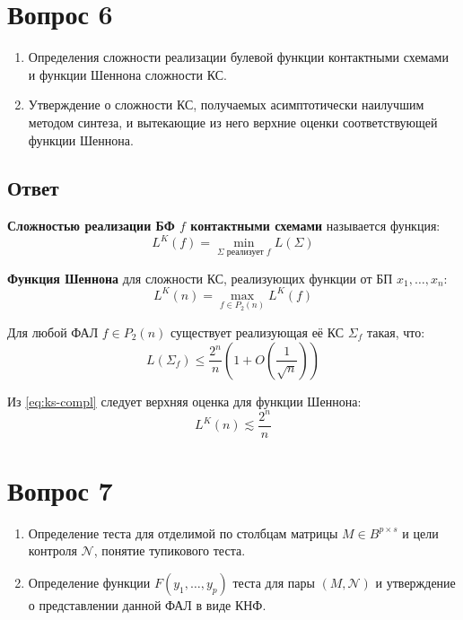 \documentclass[11pt]{article}
\def\zall{\setcounter{Def}{0}\setcounter{lem}{0}\setcounter{cnsqnc}{0}\setcounter{th}{0}\setcounter{Cmt}{0}\setcounter{equation}{0}\setcounter{stnmt}{0}}
\newcounter{Def}\setcounter{Def}{0}
\def\df{\par\smallskip\refstepcounter{Def}\textbf{\arabic{Def}}}
\newtheorem*{Def}{Определение \df}
\newcounter{lem}\setcounter{lem}{0}
\newcounter{th}\setcounter{th}{0}
\def\th{\par\smallskip\refstepcounter{th}\textbf{\arabic{th}}}
\newtheorem*{Theorem}{Теорема \th}
\newcounter{cnsqnc}\setcounter{cnsqnc}{0}
\def\cnsqnc{\par\smallskip\refstepcounter{cnsqnc}\textbf{\arabic{cnsqnc}}}
\newtheorem*{Consequence}{Следствие \cnsqnc}
\newcounter{Cmt}\setcounter{Cmt}{0}
\newcounter{stnmt}\setcounter{stnmt}{0}
\begin{document}
\section{Вопрос 6}
\label{sec:org425b54d}
\zall
\begin{enumerate}
\item Определения сложности реализации булевой функции контактными схемами и функции Шеннона сложности КС.
\item Утверждение о сложности КС, получаемых асимптотически наилучшим методом синтеза, и вытекающие из него верхние оценки соответствующей функции Шеннона.
\end{enumerate}
\subsection{Ответ}
\label{sec:org0287d00}
   \begin{Def}
   \textbf{Сложностью реализации БФ $f$ контактными схемами} называется функция:
\begin{equation*}
L^K(f) = \min_{\Sigma \text{ реализует } f}L(\Sigma)
\end{equation*}
   \end{Def}
   \begin{Def}
    \textbf{Функция Шеннона} для сложности КС, реализующих функции от БП $x_1, \ldots, x_n$:
    \begin{equation*}
        L^K(n) = \max_{f \in P_2(n)} L^K(f)
    \end{equation*}
\end{Def}
\begin{Theorem}
    Для любой ФАЛ $f \in P_2(n)$ существует реализующая её КС $\Sigma_f$ такая, что:
    \begin{equation}\label{eq:ks-compl}
        L(\Sigma_f) \leq \frac{2^n}n\left(1 + O\left(\frac1{\sqrt{n}}\right)\right)
    \end{equation}
\end{Theorem}
\begin{Consequence}
Из \eqref{eq:ks-compl} следует верхняя оценка для функции Шеннона:
\begin{equation*}
L^K(n) \lesssim \frac{2^n}n
\end{equation*}
\end{Consequence}
\pagebreak
\section{Вопрос 7}
\label{sec:orgab48943}
\zall
\begin{enumerate}
\item Определение теста для отделимой по столбцам матрицы \(M \in B^{p\times s}\) и цели контроля \(\mathcal{N}\), понятие тупикового теста.
\item Определение функции \(F(y_1, \ldots, y_p)\) теста для пары \((M, \mathcal{N})\) и утверждение о представлении данной ФАЛ в виде КНФ.
\end{enumerate}
\end{document}
